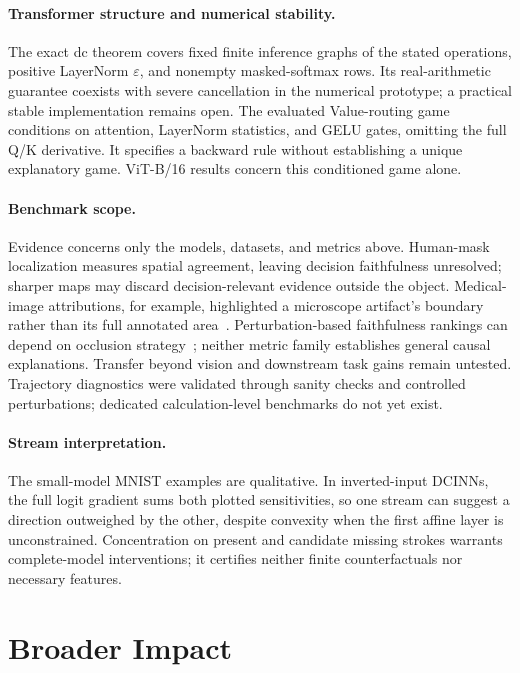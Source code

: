 \paragraph{Transformer structure and numerical stability.} The exact \ac{dc} theorem covers fixed finite inference graphs of the stated operations, positive LayerNorm $\varepsilon$, and nonempty masked-softmax rows. Its real-arithmetic guarantee coexists with severe cancellation in the numerical prototype; a practical stable implementation remains open. The evaluated Value-routing game conditions on attention, LayerNorm statistics, and GELU gates, omitting the full Q/K derivative. It specifies a backward rule without establishing a unique explanatory game. ViT-B/16 results concern this conditioned game alone.

\paragraph{Benchmark scope.} Evidence concerns only the models, datasets, and metrics above. Human-mask localization measures spatial agreement, leaving decision faithfulness unresolved; sharper maps may discard decision-relevant evidence outside the object. Medical-image attributions, for example, highlighted a microscope artifact's boundary rather than its full annotated area~\parencite{Pahde2025MedicalSafety}. Perturbation-based faithfulness rankings can depend on occlusion strategy~\parencite{Bluecher2024Decoupling}; neither metric family establishes general causal explanations. Transfer beyond vision and downstream task gains remain untested. Trajectory diagnostics were validated through sanity checks and controlled perturbations; dedicated calculation-level benchmarks do not yet exist.

\paragraph{Stream interpretation.} The small-model MNIST examples are qualitative. In inverted-input DCINNs, the full logit gradient sums both plotted sensitivities, so one stream can suggest a direction outweighed by the other, despite convexity when the first affine layer is unconstrained. Concentration on present and candidate missing strokes warrants complete-model interventions; it certifies neither finite counterfactuals nor necessary features.

\section{Broader Impact}\label{sec:broader_impact}\label{ptnb:app:broader-impact}

